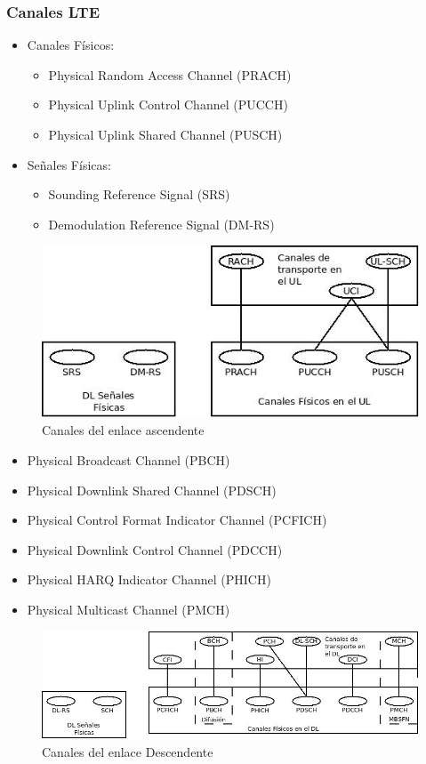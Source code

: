 	\subsubsection{Canales LTE}
	\label{ssub:canalesLTE}
		\begin{itemize}
			\item Canales Físicos:
			\begin{itemize}			
				\item Physical Random Access Channel (PRACH)
				\item Physical Uplink Control Channel (PUCCH)
				\item Physical Uplink Shared Channel (PUSCH)
			\end{itemize}
			\item Señales Físicas:
			\begin{itemize}
				\item Sounding Reference Signal (SRS)
				\item Demodulation Reference Signal (DM-RS)
			\end{itemize}
		\end{itemize}
		\begin{figure}[H]
			\centering
			\includegraphics[width=\textwidth]{Imagen/canalesAscendente.jpg}
			\caption{Canales del enlace ascendente}
		\end{figure}
		\begin{itemize}
			\item Physical Broadcast Channel (PBCH)
			\item Physical Downlink Shared Channel (PDSCH)
			\item Physical Control Format Indicator Channel (PCFICH)
			\item Physical Downlink Control Channel (PDCCH)
			\item Physical HARQ Indicator Channel (PHICH)
			\item Physical Multicast Channel (PMCH)
		\end{itemize}
		\begin{figure}[H]
			\centering
			\includegraphics[width=\textwidth]{Imagen/canalesDescendente.jpg}
			\caption{Canales del enlace Descendente}
		\end{figure}
